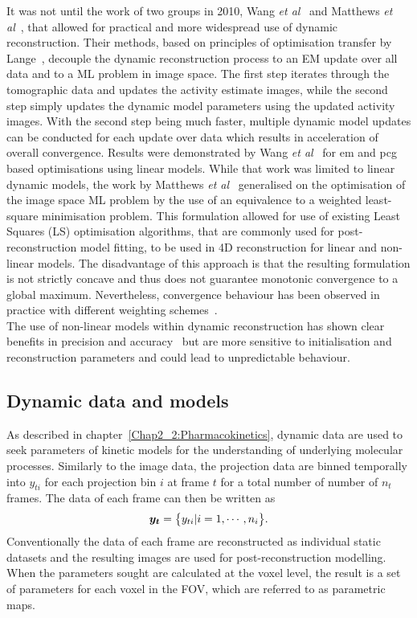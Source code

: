 It was not until the work of two groups in 2010, Wang \textit{et al}~\cite{Wang2010} and Matthews \textit{et al}~\cite{Matthews2010}, that allowed for practical and more widespread use of dynamic reconstruction. Their methods, based on principles of optimisation transfer by Lange~\cite{Lange2000}, decouple the dynamic reconstruction process to an EM update over all data and to a ML problem in image space. The first step iterates through the tomographic data and updates the activity estimate images, while the second step simply updates the dynamic model parameters using the updated activity images. With the second step being much faster, multiple dynamic model updates can be conducted for each update over data which results in acceleration of overall convergence. Results were demonstrated by Wang \textit{et al}~\cite{Wang2010} for \gls{em} and \gls{pcg} based optimisations using linear models. While that work was limited to linear dynamic models, the work by Matthews \textit{et al}~\cite{Matthews2010} generalised on the optimisation of the image space ML problem by the use of an equivalence to a weighted least-square minimisation problem. This formulation allowed for use of existing Least Squares (LS) optimisation algorithms, that are commonly used for post-reconstruction model fitting, to be used in 4D reconstruction for linear and non-linear models. The disadvantage of this approach is that the resulting formulation is not strictly concave and thus does not guarantee monotonic convergence to a global maximum. Nevertheless, convergence behaviour has been observed in practice with different weighting schemes~\cite{Gravel2015,Wang2013}. \\
The use of non-linear models within dynamic reconstruction has shown clear benefits in precision and accuracy~\cite{Angelis2014,Kotasidis2012,Gravel2015} but are more sensitive to initialisation and reconstruction parameters and could lead to unpredictable behaviour.

\subsection{Dynamic data and models}
As described in chapter~\ref{Chap2_2:Pharmacokinetics}, dynamic data are used to seek parameters of kinetic models for the understanding of underlying molecular processes. 
Similarly to the image data, the projection data are binned temporally into $y_{ti}$ for each projection bin $i$ at frame $t$ for a total number of number of $n_t$ frames. 
The data of each frame can then be written as
\begin{equation}
   \bm{y_t} = \big\{ {y_{ti}| i=1,\cdots,n_i} \big\} \\.
\end{equation}
%
Conventionally the data of each frame are reconstructed as individual static datasets and the resulting images are used for post-reconstruction modelling. When the parameters sought are calculated at the voxel level, the result is a set of parameters for each voxel in the FOV, which are referred to as parametric maps.

